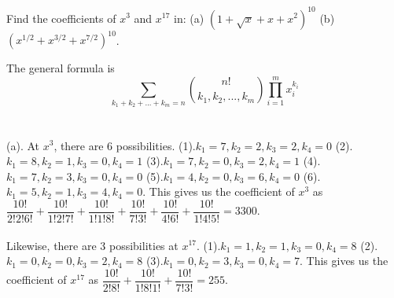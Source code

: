 \documentclass{article}
\begin{document}
\clearpage
Find the coefficients of $x^3$ and $x^{17}$ in: (a) $(1 + \sqrt{x} + x + x^2)^{10}$ (b) $(x^{1/2} + x^{3/2} + x^{7/2})^{10}$.
\vspace{1.5em}

The general formula is $$\sum_{k_1+k_2+...+k_m = n} \binom{n!}{k_1,k_2,...,k_m} \prod_{i=1}^{m}x_i^{k_i}$$\\\\
(a). At $x^3$, there are 6 possibilities. (1).$k_1 = 7, k_2 = 2, k_3 =2 , k_4 = 0$ (2).$k_1 = 8, k_2 = 1, k_3 =0 , k_4 = 1$ (3).$k_1 = 7, k_2 = 0, k_3 =2 , k_4 = 1$ (4).$k_1 = 7, k_2 = 3, k_3 = 0 , k_4 = 0$ (5).$k_1 = 4, k_2 = 0, k_3 = 6 , k_4 = 0$ (6).$k_1 = 5, k_2 = 1, k_3 = 4 , k_4 = 0$. This gives us the coefficient of $x^3$ as $\dfrac{10!}{2!2!6!}+\dfrac{10!}{1!2!7!}+\dfrac{10!}{1!1!8!}+\dfrac{10!}{7!3!}+\dfrac{10!}{4!6!}+\dfrac{10!}{1!4!5!} = 3300$.\\\\
\indent Likewise, there are 3 possibilities at $x^17$. (1).$k_1 = 1, k_2 = 1, k_3 = 0 , k_4 = 8$ (2).$k_1 = 0, k_2 = 0, k_3 = 2 , k_4 = 8$ (3).$k_1 = 0, k_2 = 3, k_3 = 0 , k_4 = 7$. This gives us the coefficient of $x^{17}$ as $\dfrac{10!}{2!8!}+\dfrac{10!}{1!8!1!}+\dfrac{10!}{7!3!} = 255$.\\\\
\vspace{1.5em}
\end{document}
